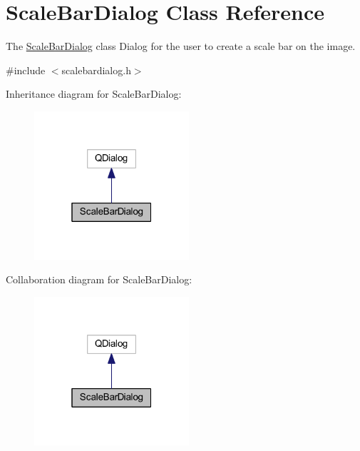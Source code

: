 \hypertarget{class_scale_bar_dialog}{\section{Scale\+Bar\+Dialog Class Reference}
\label{class_scale_bar_dialog}
}


The \hyperlink{class_scale_bar_dialog}{Scale\+Bar\+Dialog} class Dialog for the user to create a scale bar on the image.  




{\ttfamily \#include $<$scalebardialog.\+h$>$}



Inheritance diagram for Scale\+Bar\+Dialog\+:\nopagebreak
\begin{figure}[H]
\begin{center}
\leavevmode
\includegraphics[width=163pt]{class_scale_bar_dialog__inherit__graph}
\end{center}
\end{figure}


Collaboration diagram for Scale\+Bar\+Dialog\+:\nopagebreak
\begin{figure}[H]
\begin{center}
\leavevmode
\includegraphics[width=163pt]{class_scale_bar_dialog__coll__graph}
\end{center}
\end{figure}
